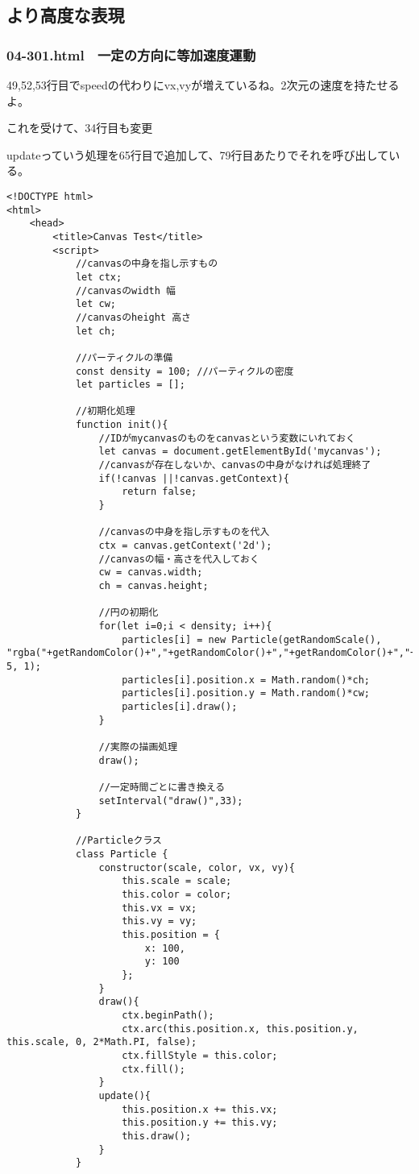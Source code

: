 \documentclass[mingoth,11pt,a4j,uplatex]{jsarticle}
\begin{document}
\subsection{より高度な表現}
\subsubsection{04-301.html　一定の方向に等加速度運動}
49,52,53行目でspeedの代わりにvx,vyが増えているね。2次元の速度を持たせるよ。

これを受けて、34行目も変更

updateっていう処理を65行目で追加して、79行目あたりでそれを呼び出している。

\begin{lstlisting}[caption=一定の方向に等加速度運動]
<!DOCTYPE html>
<html>
	<head>
		<title>Canvas Test</title>
		<script>
			//canvasの中身を指し示すもの
			let ctx;
			//canvasのwidth 幅
			let cw;
			//canvasのheight 高さ
			let ch;
			
			//パーティクルの準備
			const density = 100; //パーティクルの密度
			let particles = [];
			
			//初期化処理
			function init(){
				//IDがmycanvasのものをcanvasという変数にいれておく
				let canvas = document.getElementById('mycanvas');
				//canvasが存在しないか、canvasの中身がなければ処理終了
				if(!canvas ||!canvas.getContext){
					return false;
				}
				
				//canvasの中身を指し示すものを代入
				ctx = canvas.getContext('2d');
				//canvasの幅・高さを代入しておく
				cw = canvas.width;
				ch = canvas.height;
				
				//円の初期化
				for(let i=0;i < density; i++){
					particles[i] = new Particle(getRandomScale(), "rgba("+getRandomColor()+","+getRandomColor()+","+getRandomColor()+","+getRandomAlpha()+")", 5, 1);
					particles[i].position.x = Math.random()*ch;
					particles[i].position.y = Math.random()*cw;
					particles[i].draw();			
				}
				
				//実際の描画処理
				draw();
				
				//一定時間ごとに書き換える
				setInterval("draw()",33);
			}

			//Particleクラス
			class Particle {
				constructor(scale, color, vx, vy){
					this.scale = scale;
					this.color = color;
					this.vx = vx;
					this.vy = vy;
					this.position = {
						x: 100,
						y: 100
					};
				}
				draw(){
					ctx.beginPath();
					ctx.arc(this.position.x, this.position.y, this.scale, 0, 2*Math.PI, false);
					ctx.fillStyle = this.color;
					ctx.fill();
				}
				update(){
					this.position.x += this.vx;
					this.position.y += this.vy;
					this.draw();
				}
			}
			

\end{lstlisting}
\end{document}
